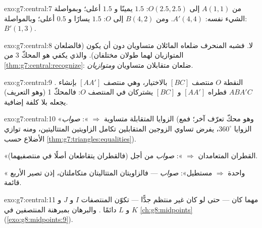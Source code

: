 \begin{solution}{exo:g7:central:7}
من $A(1,1)$ إلى $O(2.5, 2.5)$: $1.5$ يمينًا و $1.5$ أعلى؛ وبمواصلة
الشيء نفسه: $A'(4, 4)$. ومن $B(4,2)$ إلى $O$: $1.5$ يسارًا و $0.5$ أعلى؛
وبالمواصلة: $B'(1, 3)$.
\end{solution}

\begin{solution}{exo:g7:central:8}
لا. فشبه المنحرف  ضلعاه المائلان متساويان دون
أن يكون  (فالضلعان المتوازيان لهما طولان
مختلفان). والذي يكفي هو المحكّ 3 من
\cref{thm:g7:central:recognize}: ضلعان متقابلان متساويان
\emph{ومتوازيان}.
\end{solution}

\begin{solution}{exo:g7:central:9}
النقطة $O$ منتصف $[BC]$ بالاختيار، وهي منتصف
$[AA']$ بإنشاء .  $ABA'C$
قطراه $[AA']$ و $[BC]$ يشتركان في المنتصف $O$: فالمحكّ
1 (وهو التعريف) يجعله  بلا كلفة إضافية.
\end{solution}

\begin{solution}{exo:g7:central:10}
«الزوايا المتقابلة متساوية $\Rightarrow$ »: \emph{صواب}
(وهو محكّ تعرّف آخر؛ فمع  الزوايا
$360^\circ$، يفرض تساوي الزوجين المتقابلين تكامل الزاويتين
المتتاليتين، ومنه توازي الأضلاع حسب
\cref{thm:g7:triangles:equalities}).

«القطران المتعامدان $\Rightarrow$ »: \emph{صواب} من أجل
 (فالقطران يتقاطعان أصلًا في منتصفيهما).

« واحدة $\Rightarrow$ مستطيل»: \emph{صواب} ---
فالزاويتان المتتاليتان متكاملتان، إذن تصير الأربع قائمة.
\end{solution}

\begin{solution}{exo:g7:central:11}
مهما كان  --- حتى لو كان غير منتظم جدًّا --- تكوّن
المنتصفات $I$ و $J$ و $K$ و $L$ دائمًا \emph{}.
والبرهان بمبرهنة المنتصفين في \cref{ch:g8:midpoints}
(\cref{exo:g8:midpoints:9}).
\end{solution}

